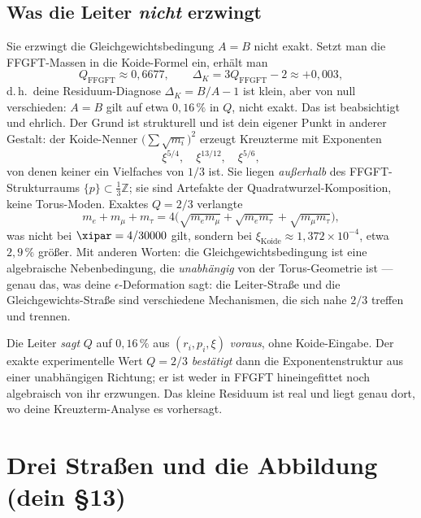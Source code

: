 \subsection*{Was die Leiter \emph{nicht} erzwingt}

Sie erzwingt die Gleichgewichtsbedingung $A=B$ nicht exakt. Setzt man die
FFGFT-Massen in die Koide-Formel ein, erhält man
\[
  Q_{\text{FFGFT}} \approx 0{,}6677,
  \qquad
  \Delta_K = 3Q_{\text{FFGFT}} - 2 \approx +0{,}003,
\]
d.\,h.\ deine Residuum-Diagnose $\Delta_K = B/A - 1$ ist klein, aber von
null verschieden: $A = B$ gilt auf etwa $0{,}16\,\%$ in $Q$, nicht exakt.
Das ist beabsichtigt und ehrlich. Der Grund ist strukturell und ist dein
eigener Punkt in anderer Gestalt: der Koide-Nenner
$\big(\sum \sqrt{m_i}\big)^2$ erzeugt Kreuzterme mit Exponenten
\[
  \xi^{5/4}, \quad \xi^{13/12}, \quad \xi^{5/6},
\]
von denen keiner ein Vielfaches von $1/3$ ist. Sie liegen \emph{außerhalb}
des FFGFT-Strukturraums $\{p\} \subset \tfrac{1}{3}\mathbb{Z}$; sie sind
Artefakte der Quadratwurzel-Komposition, keine Torus-Moden. Exaktes
$Q = 2/3$ verlangte
\[
  m_e + m_\mu + m_\tau = 4\big(\sqrt{m_e m_\mu} + \sqrt{m_e m_\tau} + \sqrt{m_\mu m_\tau}\big),
\]
was nicht bei $\xipar = 4/30000$ gilt, sondern bei $\xi_{\text{Koide}} \approx
1{,}372\times 10^{-4}$, etwa $2{,}9\,\%$ größer. Mit anderen Worten: die
Gleichgewichtsbedingung ist eine algebraische Nebenbedingung, die
\emph{unabhängig} von der Torus-Geometrie ist --- genau das, was deine
$\epsilon$-Deformation sagt: die Leiter-Straße und die Gleichgewichts-Straße
sind verschiedene Mechanismen, die sich nahe $2/3$ treffen und trennen.

\begin{keypoint}
Die Leiter \emph{sagt} $Q$ auf $0{,}16\,\%$ aus $(r_i, p_i, \xi)$
\emph{voraus}, ohne Koide-Eingabe. Der exakte experimentelle Wert $Q = 2/3$
\emph{bestätigt} dann die Exponentenstruktur aus einer unabhängigen
Richtung; er ist weder in FFGFT hineingefittet noch algebraisch von ihr
erzwungen. Das kleine Residuum ist real und liegt genau dort, wo deine
Kreuzterm-Analyse es vorhersagt.
\end{keypoint}

\section{Drei Straßen und die Abbildung (dein \S13)}

